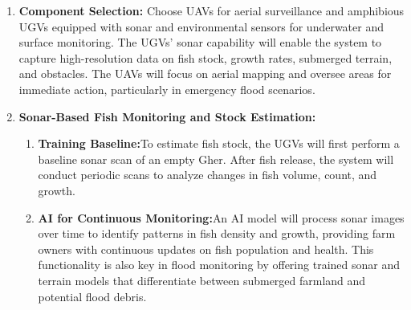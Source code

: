 \documentclass[conference]{IEEEtran}
\begin{document}
\begin{enumerate}
\begin{enumerate}
\begin{enumerate}
			\end{enumerate}
			\item \textbf{Component Selection:} Choose UAVs for aerial surveillance and amphibious UGVs equipped with sonar and environmental sensors for underwater and surface monitoring. The UGVs’ sonar capability will enable the system to capture high-resolution data on fish stock, growth rates, submerged terrain, and obstacles. The UAVs will focus on aerial mapping and oversee areas for immediate action, particularly in emergency flood scenarios.
			\item \textbf{Sonar-Based Fish Monitoring and Stock Estimation:}
				\begin{enumerate}
					\item \textbf{Training Baseline:}To estimate fish stock, the UGVs will first perform a baseline sonar scan of an empty Gher. After fish release, the system will conduct periodic scans to analyze changes in fish volume, count, and growth.
					\item \textbf{AI for Continuous Monitoring:}An AI model will process sonar images over time to identify patterns in fish density and growth, providing farm owners with continuous updates on fish population and health. This functionality is also key in flood monitoring by offering trained sonar and terrain models that differentiate between submerged farmland and potential flood debris.
				\end{enumerate}
			

\end{enumerate}
\end{enumerate}
\end{document}
